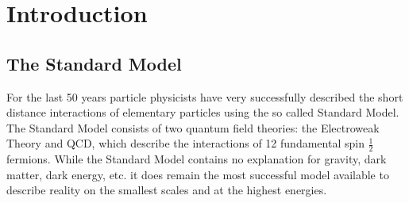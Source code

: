 \chapter{Introduction}

\section{The Standard Model}
\label{SM}
For the last 50 years particle physicists have very successfully described the short distance interactions of elementary particles using the so called Standard Model.  
The Standard Model consists of two quantum field theories: the Electroweak Theory and \gls{QCD}, which describe the interactions of 12 fundamental spin $\frac{1}{2}$ fermions.  
While the Standard Model contains no explanation for gravity, dark matter, dark energy, etc. it does remain the most successful model available to describe reality on the smallest scales and at the highest energies. \\ 

